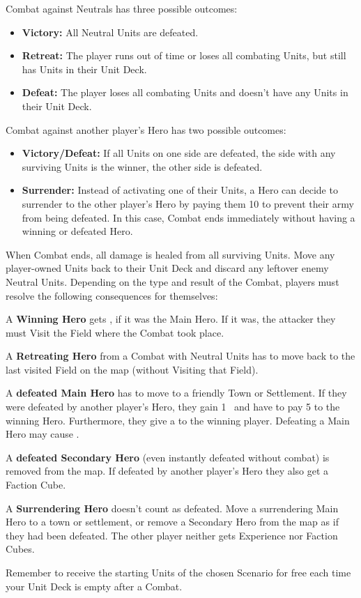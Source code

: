 \begin{multicols*}{2}
Combat against Neutrals has three possible outcomes:
\begin{itemize}
  \item \textbf{Victory:} All Neutral Units are defeated.
  \item \textbf{Retreat:} The player runs out of time or loses all combating Units, but still has Units in their Unit Deck.
  \item \textbf{Defeat:} The player loses all combating Units and doesn't have any Units in their Unit Deck.
\end{itemize}

Combat against another player's Hero has two possible outcomes:
\begin{itemize}
 \item \textbf{Victory/Defeat:} If all Units on one side are defeated, the side with any surviving Units is the winner, the other side is defeated.
 \item \textbf{Surrender:} Instead of activating one of their Units, a Hero can decide to surrender to the other player's Hero by paying them 10  to prevent their army from being defeated. In this case, Combat ends immediately without having a winning or defeated Hero.
\end{itemize}

When Combat ends, all damage is healed from all surviving Units. Move any player-owned Units back to their Unit Deck and discard any leftover enemy Neutral Units. Depending on the type and result of the Combat, players must resolve the following consequences for themselves:

A \textbf{Winning Hero} gets , if it was the Main Hero. If it was, the attacker they must Visit the Field where the Combat took place.\par
A \textbf{Retreating Hero} from a Combat with Neutral Units has to move back to the last visited Field on the map (without Visiting that Field).\par
A \textbf{defeated Main Hero} has to move to a friendly Town or Settlement. If they were defeated by another player's Hero, they gain 1~ and have to pay 5  to the winning Hero. Furthermore, they give a  to the winning player. Defeating a Main Hero may cause .\par
A \textbf{defeated Secondary Hero} (even instantly defeated without combat) is removed from the map. If defeated by another player's Hero they also get a Faction Cube.\par
A \textbf{Surrendering Hero} doesn't count as defeated. Move a surrendering Main Hero to a town or settlement, or remove a Secondary Hero from the map as if they had been defeated. The other player neither gets Experience nor Faction Cubes.\par
Remember to receive the starting Units of the chosen Scenario for free each time your Unit Deck is empty after a Combat.


\end{multicols*}
